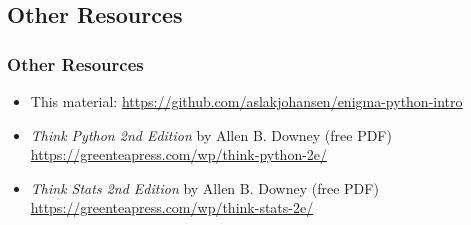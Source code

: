 %    

%    

\subsection{Other Resources}
\begin{frame}
    \frametitle{Other Resources}
    \vspace{5mm}
    
    \begin{itemize}
      \item This material: \url{https://github.com/aslakjohansen/enigma-python-intro}
      \item \textsl{Think Python 2nd Edition} by Allen B. Downey (free PDF)\\
            \url{https://greenteapress.com/wp/think-python-2e/}
      \item \textsl{Think Stats 2nd Edition} by Allen B. Downey (free PDF)\\
            \url{https://greenteapress.com/wp/think-stats-2e/}
    \end{itemize}
\end{frame}



